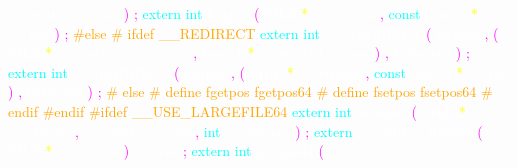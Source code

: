 \textcolor{white}{\_\_restrict} 
\textcolor{white}{\_\_pos} 
\textcolor{magenta}{)} 
\textcolor{magenta}{;} 
\textcolor{cyan}{extern} 
\textcolor{cyan}{int} 
\textcolor{white}{fsetpos} 
\textcolor{magenta}{(} 
\textcolor{white}{FILE} 
\textcolor{yellow}{*} 
\textcolor{white}{\_\_stream} 
\textcolor{magenta}{,} 
\textcolor{cyan}{const} 
\textcolor{white}{fpos\_t} 
\textcolor{yellow}{*} 
\textcolor{white}{\_\_pos} 
\textcolor{magenta}{)} 
\textcolor{magenta}{;} 
\textcolor{orange}{\#else} 
\textcolor{orange}{\# ifdef \_\_REDIRECT} 
\textcolor{cyan}{extern} 
\textcolor{cyan}{int} 
\textcolor{white}{\_\_REDIRECT} 
\textcolor{magenta}{(} 
\textcolor{white}{fgetpos} 
\textcolor{magenta}{,} 
\textcolor{magenta}{(} 
\textcolor{white}{FILE} 
\textcolor{yellow}{*} 
\textcolor{white}{\_\_restrict} 
\textcolor{white}{\_\_stream} 
\textcolor{magenta}{,} 
\textcolor{white}{fpos\_t} 
\textcolor{yellow}{*} 
\textcolor{white}{\_\_restrict} 
\textcolor{white}{\_\_pos} 
\textcolor{magenta}{)} 
\textcolor{magenta}{,} 
\textcolor{white}{fgetpos64} 
\textcolor{magenta}{)} 
\textcolor{magenta}{;} 
\textcolor{cyan}{extern} 
\textcolor{cyan}{int} 
\textcolor{white}{\_\_REDIRECT} 
\textcolor{magenta}{(} 
\textcolor{white}{fsetpos} 
\textcolor{magenta}{,} 
\textcolor{magenta}{(} 
\textcolor{white}{FILE} 
\textcolor{yellow}{*} 
\textcolor{white}{\_\_stream} 
\textcolor{magenta}{,} 
\textcolor{cyan}{const} 
\textcolor{white}{fpos\_t} 
\textcolor{yellow}{*} 
\textcolor{white}{\_\_pos} 
\textcolor{magenta}{)} 
\textcolor{magenta}{,} 
\textcolor{white}{fsetpos64} 
\textcolor{magenta}{)} 
\textcolor{magenta}{;} 
\textcolor{orange}{\# else} 
\textcolor{orange}{\# define fgetpos fgetpos64} 
\textcolor{orange}{\# define fsetpos fsetpos64} 
\textcolor{orange}{\# endif} 
\textcolor{orange}{\#endif} 
\textcolor{orange}{\#ifdef \_\_USE\_LARGEFILE64} 
\textcolor{cyan}{extern} 
\textcolor{cyan}{int} 
\textcolor{white}{fseeko64} 
\textcolor{magenta}{(} 
\textcolor{white}{FILE} 
\textcolor{yellow}{*} 
\textcolor{white}{\_\_stream} 
\textcolor{magenta}{,} 
\textcolor{white}{\_\_off64\_t} 
\textcolor{white}{\_\_off} 
\textcolor{magenta}{,} 
\textcolor{cyan}{int} 
\textcolor{white}{\_\_whence} 
\textcolor{magenta}{)} 
\textcolor{magenta}{;} 
\textcolor{cyan}{extern} 
\textcolor{white}{\_\_off64\_t} 
\textcolor{white}{ftello64} 
\textcolor{magenta}{(} 
\textcolor{white}{FILE} 
\textcolor{yellow}{*} 
\textcolor{white}{\_\_stream} 
\textcolor{magenta}{)} 
\textcolor{white}{\_\_wur} 
\textcolor{magenta}{;} 
\textcolor{cyan}{extern} 
\textcolor{cyan}{int} 
\textcolor{white}{fgetpos64} 
\textcolor{magenta}{(} 
